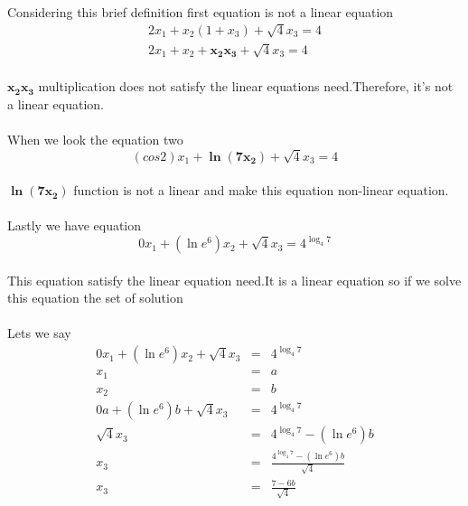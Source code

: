 \documentclass[11pt]{article}
\begin{document}
\paragraph{}Considering this brief definition first equation is not a linear equation
\begin{eqnarray}
2 x_1 + x_2(1+x_3) + \sqrt{4}x_3= 4
\\ 2 x_1 + x_2+\mathbf{x_2 x_3} + \sqrt{4}x_3= 4
\end{eqnarray}
\paragraph{} $\mathbf{x_2 x_3}$ multiplication does not satisfy the linear equations need.Therefore, it's not a linear equation.
\paragraph{} When we look the equation two
\begin{equation}
(cos 2) x_1 + \mathbf{\ln (7x_2)} + \sqrt{4}x_3= 4 
\end{equation}
\paragraph{} $\mathbf{\ln (7x_2)}$ function is not a linear and make this equation non-linear equation.

\paragraph{}Lastly we have equation
\begin{equation}
0 x_1 + (\ln e^6) x_2 + \sqrt{4}x_3= 4^{\log_4 7}
\end{equation}
\paragraph{}This equation satisfy the linear equation need.It is a linear equation so if we solve this equation the set of solution
\paragraph{}Lets we say 
\begin{eqnarray*}
0 x_1 + (\ln e^6) x_2 + \sqrt{4}x_3&=& 4^{\log_4 7}
\\x_1&=&a
\\x_2&=&b
\\0 a + (\ln e^6) b + \sqrt{4}x_3&=&4^{\log_4 7}
\\ \sqrt{4}x_3&=&4^{\log_4 7}-(\ln e^6) b
\\ x_3&=&\frac{4^{\log_4 7}-(\ln e^6) b}{\sqrt{4}}
\\ x_3&=&\frac{7-6 b}{\sqrt{4}}
\end{eqnarray*}
\end{document}
